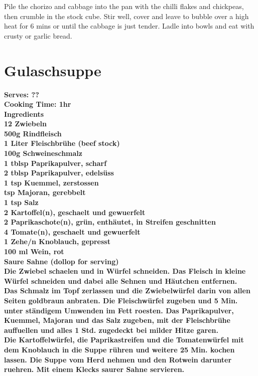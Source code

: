 \documentclass[18pt, oneside]{book}
\begin{document}
Pile the chorizo and cabbage into the pan with the chilli flakes and chickpeas, then crumble in the stock cube. Stir well, cover and leave to bubble over a high heat for 6 mins or until the cabbage is just tender. Ladle into bowls and eat with crusty or garlic bread.

\section{Gulaschsuppe}
\label{gulasch}

\bf{Serves: ??} \\
\bf{Cooking Time: 1hr} \\

\bf{Ingredients} \normalfont \\
12 Zwiebeln \\
500g Rindfleisch \\ 
1 Liter Fleischbr\"{u}he  (beef stock) \\
100g Schweineschmalz  \\
1 tblsp Paprikapulver, scharf \\ 
2 tblsp Paprikapulver, edels\"{u}ss  \\
1 tsp 	Kuemmel, zerstossen  \\
 tsp 	Majoran, gerebbelt \\
1 tsp 	Salz \\
2 Kartoffel(n), geschaelt und gewuerfelt \\
2 Paprikaschote(n), grün, enthäutet, in Streifen geschnitten \\
4 Tomate(n), geschaelt und gewuerfelt \\
1 Zehe/n 	Knoblauch, gepresst \\
100 ml 	Wein, rot \\
Saure Sahne (dollop for serving) \\

Die Zwiebel schaelen und in Würfel schneiden. Das Fleisch in kleine Würfel schneiden und dabei alle Sehnen und H\"{a}utchen entfernen. \\

Das Schmalz im Topf zerlassen und die Zwiebelw\"{u}rfel darin von allen Seiten goldbraun anbraten. Die Fleischw\"{u}rfel zugeben und 5 Min. unter ständigem Umwenden im Fett roesten. Das Paprikapulver, Kuemmel, Majoran und das Salz zugeben, mit der Fleischbrühe auffuellen und alles 1 Std. zugedeckt bei milder Hitze garen. \\ 

Die Kartoffelw\"{u}rfel, die Paprikastreifen und die Tomatenw\"{u}rfel mit dem Knoblauch in die Suppe rühren und weitere 25 Min. kochen lassen. Die Suppe vom Herd nehmen und den Rotwein darunter ruehren. Mit einem Klecks saurer Sahne servieren.
\end{document}
